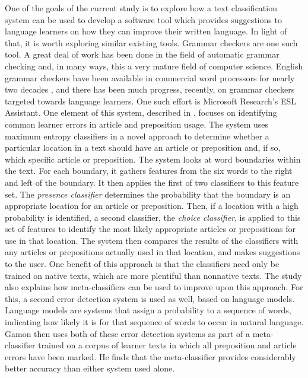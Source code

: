 \documentclass[main.tex]{subfiles}
\begin{document}
One of the goals of the current study is to explore how a text classification system can be used to develop a software tool which provides suggestions to language learners on how they can improve their written language. In light of that, it is worth exploring similar existing tools. Grammar checkers are one such tool. A great deal of work has been done in the field of automatic grammar checking and, in many ways, this a very mature field of computer science. English grammar checkers have been available in commercial word processors for nearly two decades \citep{vernon:2000}, and there has been much progress, recently, on grammar checkers targeted towards language learners. One such effort is Microsoft Research's ESL Assistant. One element of this system, described in \citet{gamon:2010}, focuses on identifying common learner errors in article and preposition usage. The system uses maximum entropy classifiers in a novel approach to determine whether a particular location in a text should have an article or preposition and, if so, which specific article or preposition. The system looks at word boundaries within the text. For each boundary, it gathers features from the six words to the right and left of the boundary. It then applies the first of two classifiers to this feature set. The \textit{presence classifier} determines the probability that the boundary is an appropriate location for an article or preposition. Then, if a location with a high probability is identified, a second classifier, the \textit{choice classifier}, is applied to this set of features to identify the most likely appropriate articles or prepositions for use in that location. The system then compares the results of the classifiers with any articles or prepositions actually used in that location, and makes suggestions to the user. One benefit of this approach is that the classifiers need only be trained on native texts, which are more plentiful than nonnative texts. The study also explains how meta-classifiers can be used to improve upon this approach. For this, a second error detection system is used as well, based on language models. Language models are systems that assign a probability to a sequence of words, indicating how likely it is for that sequence of words to occur in natural language. Gamon then uses both of these error detection systems as part of a meta-classifier trained on a corpus of learner texts in which all preposition and article errors have been marked. He finds that the meta-classifier provides considerably better accuracy than either system used alone.
\end{document}
